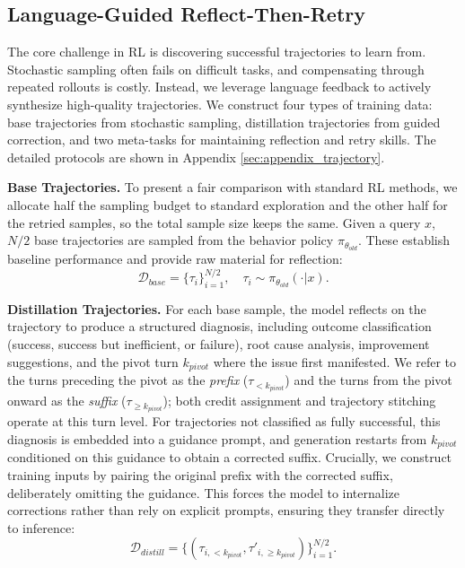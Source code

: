 \documentclass[11pt]{article}
\theoremstyle{definition}
\theoremstyle{remark}
\begin{document}
\subsection{Language-Guided Reflect-Then-Retry}
The core challenge in RL is discovering successful trajectories to learn from. Stochastic sampling often fails on difficult tasks, and compensating through repeated rollouts is costly. Instead, we leverage language feedback to actively synthesize high-quality trajectories. We construct four types of training data: base trajectories from stochastic sampling, distillation trajectories from guided correction, and two meta-tasks for maintaining reflection and retry skills. The detailed protocols are shown in Appendix \ref{sec:appendix_trajectory}.

\textbf{Base Trajectories.} To present a fair comparison with standard RL methods, we allocate half the sampling budget to standard exploration and the other half for the retried samples, so the total sample size keeps the same. Given a query $x$, $N/2$ base trajectories are sampled from the behavior policy $\pi_{\theta_{old}}$. These establish baseline performance and provide raw material for reflection:
\begin{equation}
    \mathcal{D}_{base} = \{\tau_i\}_{i=1}^{N/2}, \quad \tau_i \sim \pi_{\theta_{old}}(\cdot | x).
\end{equation}

\textbf{Distillation Trajectories.} For each base sample, the model reflects on the trajectory to produce a structured diagnosis, including outcome classification (success, success but inefficient, or failure), root cause analysis, improvement suggestions, and the pivot turn $k_{pivot}$ where the issue first manifested. We refer to the turns preceding the pivot as the \emph{prefix} ($\tau_{<k_{pivot}}$) and the turns from the pivot onward as the \emph{suffix} ($\tau_{\geq k_{pivot}}$); both credit assignment and trajectory stitching operate at this turn level. For trajectories not classified as fully successful, this diagnosis is embedded into a guidance prompt, and generation restarts from $k_{pivot}$ conditioned on this guidance to obtain a corrected suffix. Crucially, we construct training inputs by pairing the original prefix with the corrected suffix, deliberately omitting the guidance. This forces the model to internalize corrections rather than rely on explicit prompts, ensuring they transfer directly to inference:
\begin{equation}
    \mathcal{D}_{distill} = \{(\tau_{i,<k_{pivot}}, \tau'_{i,\geq k_{pivot}})\}_{i=1}^{N/2}.
\end{equation}
\end{document}
